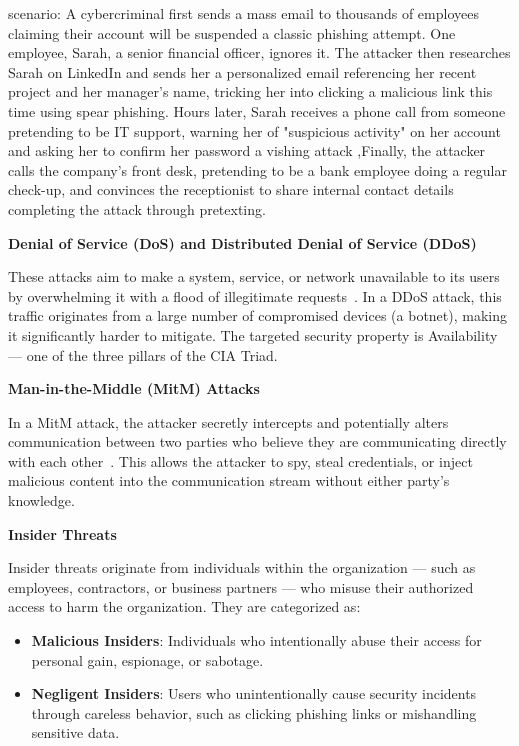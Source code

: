 scenario: A cybercriminal first sends a mass email to thousands of employees claiming their account will be suspended  a classic phishing attempt. One employee, Sarah, a senior financial officer, ignores it. The attacker then researches Sarah on LinkedIn and sends her a personalized email referencing her recent project and her manager's name, tricking her into clicking a malicious link  this time using spear phishing. Hours later, Sarah receives a phone call from someone pretending to be IT support, warning her of "suspicious activity" on her account and asking her to confirm her password  a vishing attack ,Finally, the attacker calls the company's front desk, pretending to be a bank employee doing a regular check-up, and convinces the receptionist to share internal contact details  completing the attack through pretexting.


\textbf{Denial of Service (DoS) and Distributed Denial of Service (DDoS)}\par
These attacks aim to make a system, service, or network unavailable to its  users by overwhelming it with a flood of illegitimate requests~\cite{paloalto2024dos}. In a DDoS attack, this traffic originates from a large number of compromised devices (a botnet), making it significantly harder to mitigate. The targeted security property is Availability --- one of the three pillars of the CIA Triad.

\vspace{1em}
\textbf{Man-in-the-Middle (MitM) Attacks}\par
In a MitM attack, the attacker secretly intercepts and potentially alters communication between two parties who believe they are communicating directly with each other~\cite{hussain2023mitm,rapid72024mitm}. This allows the attacker to spy, steal credentials, or inject malicious content into the communication stream without either party's knowledge.

\vspace{1em}
\textbf{Insider Threats}\par
Insider threats originate from individuals within the organization --- such as employees, contractors, or business partners --- who misuse their authorized access to harm the organization. They are categorized as:
\begin{itemize}
    \item \textbf{Malicious Insiders}: Individuals who intentionally abuse their access for personal gain, espionage, or sabotage.
    \item \textbf{Negligent Insiders}: Users who unintentionally cause security incidents through careless behavior, such as clicking phishing links or mishandling sensitive data.
\end{itemize}

